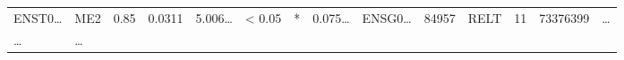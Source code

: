 \documentclass[
]{article}
\begin{document}
\begin{longtable}[]{@{}llllllllllllll@{}}
\begin{minipage}[t]{0.05\columnwidth}
ENST0\ldots{}\strut
\end{minipage} & \begin{minipage}[t]{0.04\columnwidth}\raggedright
ME2\strut
\end{minipage} & \begin{minipage}[t]{0.04\columnwidth}\raggedright
0.85\strut
\end{minipage} & \begin{minipage}[t]{0.04\columnwidth}\raggedright
0.0311\strut
\end{minipage} & \begin{minipage}[t]{0.05\columnwidth}\raggedright
5.006\ldots{}\strut
\end{minipage} & \begin{minipage}[t]{0.05\columnwidth}\raggedright
\textless{} 0.05\strut
\end{minipage} & \begin{minipage}[t]{0.03\columnwidth}\raggedright
*\strut
\end{minipage} & \begin{minipage}[t]{0.05\columnwidth}\raggedright
0.075\ldots{}\strut
\end{minipage} & \begin{minipage}[t]{0.05\columnwidth}\raggedright
ENSG0\ldots{}\strut
\end{minipage} & \begin{minipage}[t]{0.05\columnwidth}\raggedright
84957\strut
\end{minipage} & \begin{minipage}[t]{0.05\columnwidth}\raggedright
RELT\strut
\end{minipage} & \begin{minipage}[t]{0.05\columnwidth}\raggedright
11\strut
\end{minipage} & \begin{minipage}[t]{0.05\columnwidth}\raggedright
73376399\strut
\end{minipage} & \begin{minipage}[t]{0.02\columnwidth}\raggedright
\ldots{}\strut
\end{minipage}\tabularnewline
\begin{minipage}[t]{0.05\columnwidth}\raggedright
\ldots{}\strut
\end{minipage} & \begin{minipage}[t]{0.04\columnwidth}\raggedright
\ldots{}\strut
\end{minipage} & \begin{minipage}[t]{0.04\columnwidth}\raggedright

\end{minipage}
\end{longtable}
\end{document}
